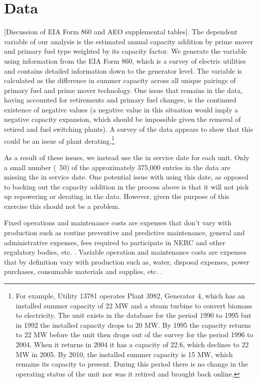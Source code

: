 \documentclass[10pt]{amsart}
\begin{document}
\section{Data}
[Discussion of EIA Form 860 and AEO supplemental tables].
The dependent variable of our analysis is the estimated annual capacity addition by prime mover and primary fuel type weighted by its capacity factor.
We generate the variable using information from the EIA Form 860, which is a survey of electric utilities and contains detailed information down to the generator level.
The variable is calculated as the difference in summer capacity across all unique pairings of primary fuel and prime mover technology.
One issue that remains in the data, having accounted for retirements and primary fuel changes, is the continued existence of negative values (a negative value in this situation would imply a negative capacity expansion, which should be impossible given the removal of retired and fuel switching plants).
A survey of the data appears to show that this could be an issue of plant derating.\footnote{For example, Utility 13781 operates Plant 3982, Generator 4, which has an installed summer capacity of 22 MW and a steam turbine to convert biomass to electricity. The unit exists in the database for the period 1990 to 1995 but in 1992 the installed capacity drops to 20 MW. By 1995 the capacity returns to 22 MW before the unit then drops out of the survey for the period 1996 to 2004. When it returns in 2004 it has a capacity of 22.6, which declines to 22 MW in 2005. By 2010, the installed summer capacity is 15 MW, which remains its capacity to present. During this period there is no change in the operating status of the unit nor was it retired and brought back online.} 

As a result of these issues, we instead use the in service date for each unit. 
Only a small number (~50) of the approximately 375,000 entries in the data are missing the in service date.
One potential issue with using this date, as opposed to backing out the capacity addition in the process above is that it will not pick up repowering or derating in the data.
However, given the purpose of this exercise this should not be a problem. 
  


Fixed operations and maintenance costs are expenses that don't vary with production such as routine preventive and predictive maintenance, general and administrative expenses, fees required to participate in NERC and other regulatory bodies, etc. \parencite{eiaupdatedcapital2010}.
Variable operation and maintenance costs are expenses that by definition vary with production such as, water, disposal expenses, power purchases, consumable materials and supplies, etc. \parencite{eiaupdatedcapital2010}.   
\end{document}
